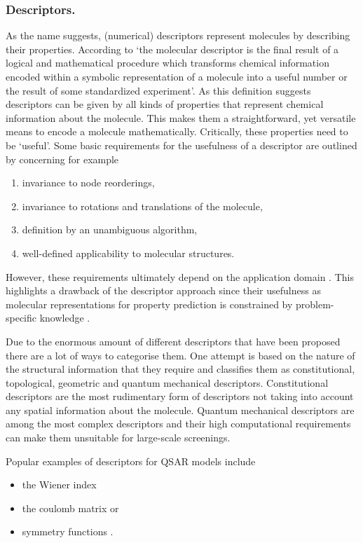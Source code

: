 \subsubsection*{Descriptors.}
As the name suggests, (numerical) descriptors represent molecules by describing their properties. According to \cite{todeschini2008handbook} `the molecular descriptor is the final result of a logical and mathematical procedure which transforms chemical information encoded within a symbolic representation of a molecule into a useful number or the result of some standardized experiment'. As this definition suggests descriptors can be given by all kinds of properties that represent chemical information about the molecule. This makes them a straightforward, yet versatile means to encode a molecule mathematically. Critically, these properties need to be `useful'. Some basic requirements for the usefulness of a descriptor are outlined by \cite{Mauri2016} concerning for example
\begin{enumerate}
	\item invariance to node reorderings,
	\item invariance to rotations and translations of the molecule,
	\item definition by an unambiguous algorithm,
	\item well-defined applicability to molecular structures.
\end{enumerate}
However, these requirements ultimately depend on the application domain \citep{jiang}. This highlights a drawback of the descriptor approach since their usefulness as molecular representations for property prediction is constrained by  problem-specific knowledge \citep{SHEN201929}. 

Due to the enormous amount of different descriptors that have been proposed there are a lot of ways to categorise them. One attempt is based on the nature of the structural information that they require \citep{descript} and classifies them as constitutional, topological, geometric and quantum mechanical descriptors. Constitutional descriptors are the most rudimentary form of descriptors not taking into account any spatial information about the molecule. Quantum mechanical descriptors are among the most complex descriptors and their high computational requirements can make them unsuitable for large-scale screenings. 

Popular examples of descriptors for QSAR models include \begin{itemize}
	\item the Wiener index \citep{wiener1947structural, nikolic2001wiener}
	\item the coulomb matrix \citep{coulumb} or
	\item symmetry functions \citep{symfunc}.
\end{itemize}

